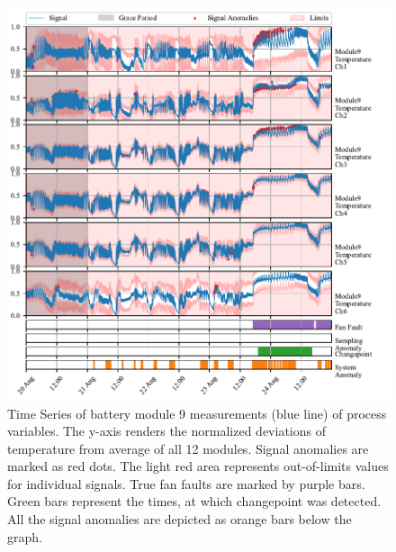 \begin{figure}[htbp]
 \centerline{\includegraphics{figures/Kokam_thresh.pdf}}
 \caption{Time Series of battery module 9 measurements (blue line) of process variables. The y-axis renders the normalized deviations of temperature from average of all 12 modules. Signal anomalies are marked as red dots. The light red area represents out-of-limits values for individual signals. True fan faults are marked by purple bars. Green bars represent the times, at which changepoint was detected. All the signal anomalies are depicted as orange bars below the graph.}
 \label{fig:kokam}
\end{figure}
